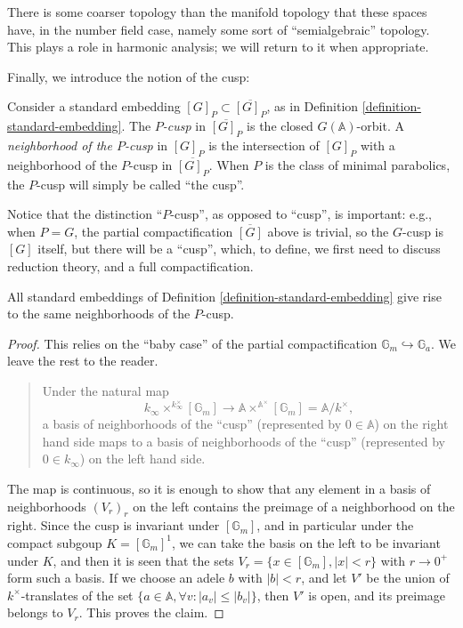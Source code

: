 There is some coarser topology than the manifold topology that these spaces have, in the number field case, namely some sort of ``semialgebraic'' topology. This plays a role in harmonic analysis; we will return to it when appropriate.

Finally, we introduce the notion of the cusp:
\begin{definition}
 \label{definition-P-cusp}
 Consider a standard embedding $[G]_P \subset \overline{[G]_P}$, as in Definition \ref{definition-standard-embedding}. The {\it $P$-cusp} in $\overline{[G]_P}$ is the closed $G(\mathbb A)$-orbit. A {\it neighborhood of the $P$-cusp} in $[G]_P$ is the intersection of $[G]_P$ with a neighborhood of the $P$-cusp in $\overline{[G]_P}$. When $P$ is the class of minimal parabolics, the $P$-cusp will simply be called ``the cusp''.
\end{definition}

Notice that the distinction ``$P$-cusp'', as opposed to ``cusp'', is important: e.g., when $P=G$, the partial compactification $\overline{[G]}$ above is trivial, so the $G$-cusp is $[G]$ itself, but there will be a ``cusp'', which, to define, we first need to discuss reduction theory, and a full compactification. 

\begin{lemma}
\label{lemma-definitions-cusp-equivalent}
All standard embeddings of Definition \ref{definition-standard-embedding} give rise to the same neighborhoods of the $P$-cusp.
\end{lemma}


\begin{proof}
This relies on the ``baby case'' of the partial compactification $\mathbb G_m\hookrightarrow \mathbb G_a$. We leave the rest to the reader.


 \begin{quote}
Under the natural map 
$$ k_\infty \times^{k_\infty^\times} [\mathbb G_m] \to \mathbb A \times^{\mathbb A^\times} [\mathbb G_m] = \mathbb A/k^\times,$$
a basis of neighborhoods of the ``cusp'' (represented by $0\in \mathbb A$) on the right hand side maps to a basis of neighborhoods of the ``cusp'' (represented by $0\in k_\infty$) on the left hand side.
\end{quote}

The map is continuous, so it is enough to show that any element in a basis of neighborhoods $(V_r)_r$ on the left contains the preimage of a neighborhood on the right. Since the cusp is invariant under $[\mathbb G_m]$, and in particular under the compact subgoup $K=[\mathbb G_m]^1$, we can take the basis on the left to be invariant under $K$, and then it is seen that the sets $V_r = \{ x\in [\mathbb G_m], |x|<r\}$  with $r\to 0^+$ form such a basis. If we choose an adele $b$ with $|b|<r$, and let $V'$ be the union of $k^\times$-translates of the set $\{a \in \mathbb A, \forall v:  |a_v|\le |b_v|\}$, then $V'$ is open, and its preimage belongs to $V_r$. This proves the claim. 

\end{proof}




